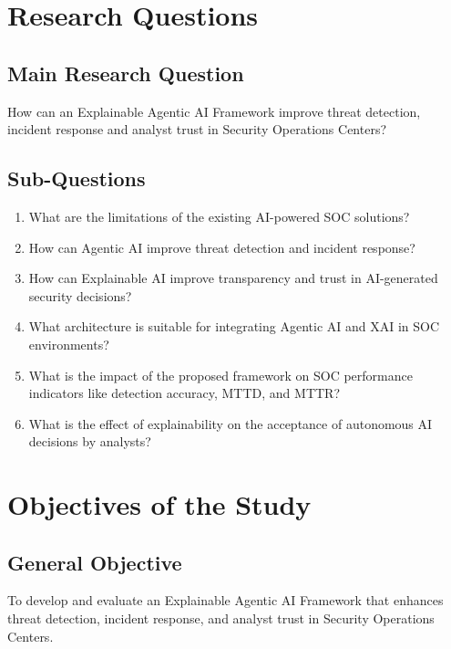 \documentclass[12pt,a4paper]{report}
\begin{document}
\section{Research Questions}
\label{sec:research_questions}

\subsection{Main Research Question}
How can an Explainable Agentic AI Framework improve threat detection, incident response and analyst trust in Security Operations Centers?

\subsection{Sub-Questions}
\begin{enumerate}[label=\arabic*.]
    \item What are the limitations of the existing AI-powered SOC solutions?
    \item How can Agentic AI improve threat detection and incident response?
    \item How can Explainable AI improve transparency and trust in AI-generated security decisions?
    \item What architecture is suitable for integrating Agentic AI and XAI in SOC environments?
    \item What is the impact of the proposed framework on SOC performance indicators like detection accuracy, MTTD, and MTTR?
    \item What is the effect of explainability on the acceptance of autonomous AI decisions by analysts?
\end{enumerate}

\section{Objectives of the Study}
\label{sec:objectives}

\subsection{General Objective}
To develop and evaluate an Explainable Agentic AI Framework that enhances threat detection, incident response, and analyst trust in Security Operations Centers.
\end{document}
